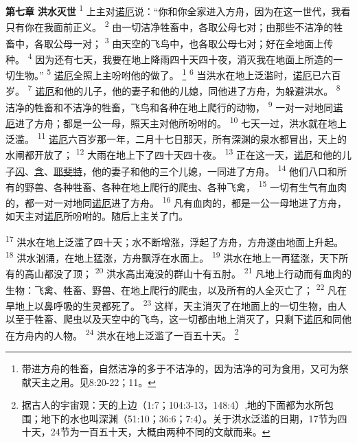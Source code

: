 \textbf{第七章 }
\textbf{洪水灭世 }
\textsuperscript{1}
上主对\uline{诺厄}说：“你和你全家进入方舟，因为在这一世代，我看只有你在我面前正义。
\textsuperscript{2}
由一切洁净牲畜中，各取公母七对；由那些不洁净的牲畜中，各取公母一对；
\textsuperscript{3}
由天空的飞鸟中，也各取公母七对；好在全地面上传种。
\textsuperscript{4}
因为还有七天，我要在地上降雨四十天四十夜，消灭我在地面上所造的一切生物。”
\textsuperscript{5}
\uline{诺厄}全照上主吩咐他的做了。
\footnote{带进方舟的牲畜，自然洁净的多于不洁净的，因为洁净的可为食用，又可为祭献天主之用。见8:20-22；11。}
\textsuperscript{6}
当洪水在地上泛滥时，\uline{诺厄}已六百岁。
\textsuperscript{7}
\uline{诺厄}和他的儿子，他的妻子和他的儿媳，同他进了方舟，为躲避洪水。
\textsuperscript{8}
洁净的牲畜和不洁净的牲畜，飞鸟和各种在地上爬行的动物，
\textsuperscript{9}
一对一对地同\uline{诺厄}进了方舟；都是一公一母，照天主对他所吩咐的。
\textsuperscript{10}
七天一过，洪水就在地上泛滥。
\textsuperscript{11}
\uline{诺厄}六百岁那一年，二月十七日那天，所有深渊的泉水都冒出，天上的水闸都开放了；
\textsuperscript{12}
大雨在地上下了四十天四十夜。
\textsuperscript{13}
正在这一天，\uline{诺厄}和他的儿子\uline{闪}、\uline{含}、\uline{耶斐特}，他的妻子和他的三个儿媳，一同进了方舟。
\textsuperscript{14}
他们八口和所有的野兽、各种牲畜、各种在地上爬行的爬虫、各种飞禽，
\textsuperscript{15}
一切有生气有血肉的，都一对一对地同\uline{诺厄}进了方舟。
\textsuperscript{16}
凡有血肉的，都是一公一母地进了方舟，如天主对\uline{诺厄}所吩咐的。随后上主关了门。

\textsuperscript{17}
洪水在地上泛滥了四十天；水不断增涨，浮起了方舟，方舟遂由地面上升起。
\textsuperscript{18}
洪水汹涌，在地上猛涨，方舟飘浮在水面上。
\textsuperscript{19}
洪水在地上一再猛涨，天下所有的高山都没了顶；
\textsuperscript{20}
洪水高出淹没的群山十有五肘。
\textsuperscript{21}
凡地上行动而有血肉的生物：飞禽、牲畜、野兽、在地上爬行的爬虫，以及所有的人全灭亡了；
\textsuperscript{22}
凡在旱地上以鼻呼吸的生灵都死了。
\textsuperscript{23}
这样，天主消灭了在地面上的一切生物，由人以至于牲畜、爬虫以及天空中的飞鸟，这一切都由地上消灭了，只剩下\uline{诺厄}和同他在方舟内的人物。
\textsuperscript{24}
洪水在地上泛滥了一百五十天。
\footnote{据古人的宇宙观：天的上边（1:7；104:3-13，148:4）,地的下面都为水所包围；地下的水也叫深渊（51:10；36:6；7:4）。关于洪水泛滥的日期，17节为四十天，24节为一百五十天，大概由两种不同的文献而来。}

